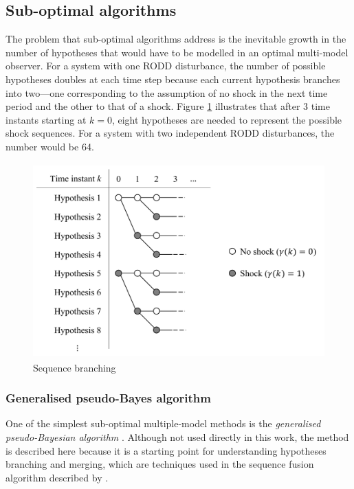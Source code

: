 \subsection{Sub-optimal algorithms}

The problem that sub-optimal algorithms address is the inevitable growth in the number of hypotheses that would have to be modelled in an optimal multi-model observer. For a system with one \gls{RODD} disturbance, the number of possible hypotheses doubles at each time step because each current hypothesis branches into two—one corresponding to the assumption of no shock in the next time period and the other to that of a shock. Figure \ref{fig:mm-obs-br} illustrates that after 3 time instants starting at $k=0$, eight hypotheses are needed to represent the possible shock sequences. For a system with two independent \gls{RODD} disturbances, the number would be 64.

\begin{figure}[htp]
	\centering
	\includegraphics[height=7.5cm]{images/mm_obs_seq_br.pdf}
	\caption{Sequence branching}
	\label{fig:mm-obs-br}
\end{figure}

\subsubsection{Generalised pseudo-Bayes algorithm} \label{subsec-GPB}

One of the simplest sub-optimal multiple-model methods is the \textit{generalised pseudo-Bayesian algorithm} \citep{buxbaum_recursive_1969, jaffer_estimation_1971, tugnait_detection_1982}. Although not used directly in this work, the method is described here because it is a starting point for understanding hypotheses branching and merging, which are techniques used in the sequence fusion algorithm described by \cite{robertson_detection_1995}.

